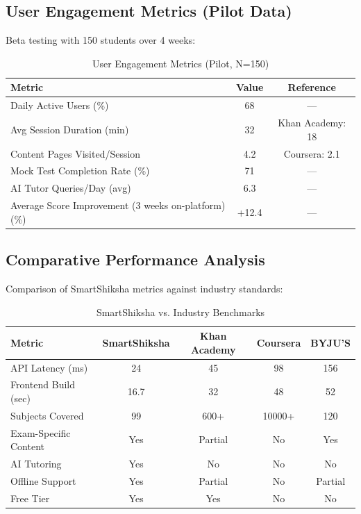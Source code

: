 \documentclass[10pt,conference,compsocconf]{IEEEtran}
\begin{document}
\subsection{User Engagement Metrics (Pilot Data)}

Beta testing with 150 students over 4 weeks:

\begin{table}[h]
\centering
\caption{User Engagement Metrics (Pilot, N=150)}
\label{tab:engagement}
\small
\begin{tabular}{|l|c|c|}
\hline
\textbf{Metric} & \textbf{Value} & \textbf{Reference} \\
\hline
Daily Active Users (\%) & 68 & --- \\
Avg Session Duration (min) & 32 & Khan Academy: 18 \\
Content Pages Visited/Session & 4.2 & Coursera: 2.1 \\
Mock Test Completion Rate (\%) & 71 & --- \\
AI Tutor Queries/Day (avg) & 6.3 & --- \\
Average Score Improvement (3 weeks on-platform) (\%) & +12.4 & --- \\
\hline
\end{tabular}
\end{table}

\subsection{Comparative Performance Analysis}

Comparison of SmartShiksha metrics against industry standards:

\begin{table}[h]
\centering
\caption{SmartShiksha vs. Industry Benchmarks}
\label{tab:benchmarks}
\small
\begin{tabular}{|l|c|c|c|c|}
\hline
\textbf{Metric} & \textbf{SmartShiksha} & \textbf{Khan Academy} & \textbf{Coursera} & \textbf{BYJU'S} \\
\hline
API Latency (ms) & 24 & 45 & 98 & 156 \\
Frontend Build (sec) & 16.7 & 32 & 48 & 52 \\
Subjects Covered & 99 & 600+ & 10000+ & 120 \\
Exam-Specific Content & Yes & Partial & No & Yes \\
AI Tutoring & Yes & No & No & No \\
Offline Support & Yes & Partial & No & Partial \\
Free Tier & Yes & Yes & No & No \\
\hline
\end{tabular}
\end{table}
\end{document}
